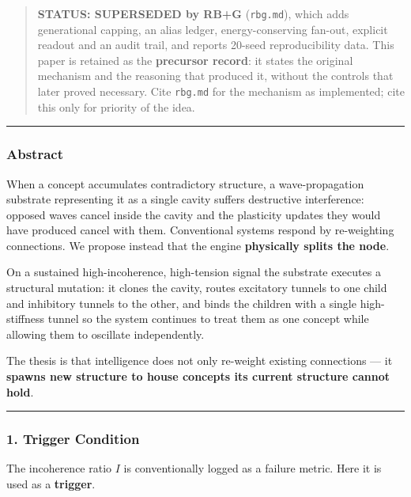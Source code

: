\documentclass[
  11pt,
  a4paper,
]{article}
\begin{document}
\begin{quote}
\textbf{STATUS: SUPERSEDED by RB+G} (\texttt{rbg.md}), which adds
generational capping, an alias ledger, energy-conserving fan-out,
explicit readout and an audit trail, and reports 20-seed reproducibility
data. This paper is retained as the \textbf{precursor record}: it states
the original mechanism and the reasoning that produced it, without the
controls that later proved necessary. Cite \texttt{rbg.md} for the
mechanism as implemented; cite this only for priority of the idea.
\end{quote}

\begin{center}\rule{0.5\linewidth}{0.5pt}\end{center}

\subsubsection{Abstract}\label{abstract}

When a concept accumulates contradictory structure, a wave-propagation
substrate representing it as a single cavity suffers destructive
interference: opposed waves cancel inside the cavity and the plasticity
updates they would have produced cancel with them. Conventional systems
respond by re-weighting connections. We propose instead that the engine
\textbf{physically splits the node}.

On a sustained high-incoherence, high-tension signal the substrate
executes a structural mutation: it clones the cavity, routes excitatory
tunnels to one child and inhibitory tunnels to the other, and binds the
children with a single high-stiffness tunnel so the system continues to
treat them as one concept while allowing them to oscillate
independently.

The thesis is that intelligence does not only re-weight existing
connections --- it \textbf{spawns new structure to house concepts its
current structure cannot hold}.

\begin{center}\rule{0.5\linewidth}{0.5pt}\end{center}

\subsubsection{1. Trigger Condition}\label{trigger-condition}

The incoherence ratio \(I\) is conventionally logged as a failure
metric. Here it is used as a \textbf{trigger}.
\end{document}
